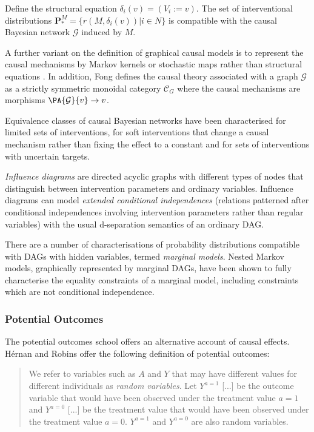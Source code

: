 Define the structural equation $\delta_i(v)=(V_i:=v)$. The set of interventional distributions $\mathbf{P}^M_*=\{r(M,\delta_i(v))|i\in N\}$ is compatible with the causal Bayesian network $\mathcal{G}$ induced by $M$\cite{pearl_causality:_2009}.

A further variant on the definition of graphical causal models is to represent the causal mechanisms by Markov kernels or stochastic maps rather than structural equations \cite{eaton_exact_2007,fong_causal_2013}. In addition, Fong defines the causal theory associated with a graph $\mathcal{G}$ as a strictly symmetric monoidal category $\mathcal{C}_G$ where the causal mechanisms are morphisms $\PA{\mathcal{G}}{v}\to v$\cite{fong_causal_2013}.

Equivalence classes of causal Bayesian networks have been characterised for limited sets of interventions\cite{hauser_characterization_2012,mooij_joint_2016}, for soft interventions that change a causal mechanism rather than fixing the effect to a constant\cite{yang_characterizing_2018} and for sets of interventions with uncertain targets\cite{eaton_exact_2007}.

\emph{Influence diagrams} are directed acyclic graphs with different types of nodes that distinguish between intervention parameters and ordinary variables. Influence diagrams can model \emph{extended conditional independences} (relations patterned after conditional independences involving intervention parameters rather than regular variables) with the usual d-separation semantics of an ordinary DAG\cite{dawid_beware_2010,dawid_influence_2002}.

There are a number of characterisations of probability distributions compatible with DAGs with hidden variables, termed \emph{marginal models}. Nested Markov models, graphically represented by marginal DAGs, have been shown to fully characterise the equality constraints of a marginal model, including constraints which are not conditional independence\cite{evans_margins_2015,kang_inequality_2012}.

\subsubsection{Potential Outcomes}

The potential outcomes school offers an alternative account of causal effects. H\'ernan and Robins offer the following definition of potential outcomes\cite{hernan_causal_2018}:

\begin{quote}
    We refer to variables such as $A$ and $Y$ that may have different values for different individuals as \emph{random variables}. Let $Y^{a=1}$ [...] be the outcome variable that would have been observed under the treatment value $a=1$ and $Y^{a=0}$ [...] be the treatment value that would have been observed under the treatment value $a=0$. $Y^{a=1}$ and $Y^{a=0}$ are also random variables.
\end{quote}

